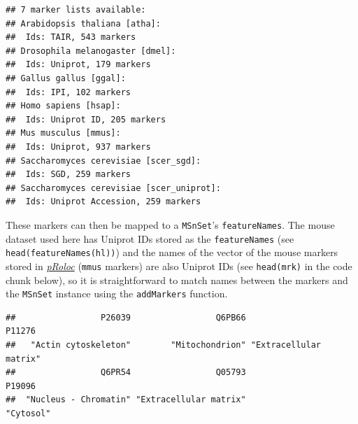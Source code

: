 \begin{Shaded}
\begin{Highlighting}[]
\NormalTok{()}
\end{Highlighting}
\end{Shaded}

\begin{verbatim}
## 7 marker lists available:
## Arabidopsis thaliana [atha]:
##  Ids: TAIR, 543 markers
## Drosophila melanogaster [dmel]:
##  Ids: Uniprot, 179 markers
## Gallus gallus [ggal]:
##  Ids: IPI, 102 markers
## Homo sapiens [hsap]:
##  Ids: Uniprot ID, 205 markers
## Mus musculus [mmus]:
##  Ids: Uniprot, 937 markers
## Saccharomyces cerevisiae [scer_sgd]:
##  Ids: SGD, 259 markers
## Saccharomyces cerevisiae [scer_uniprot]:
##  Ids: Uniprot Accession, 259 markers
\end{verbatim}

These markers can then be mapped to a \texttt{MSnSet}'s
\texttt{featureNames}. The mouse dataset used here has Uniprot IDs
stored as the \texttt{featureNames} (see
\texttt{head(featureNames(hl))}) and the names of the vector of the
mouse markers stored in
\emph{\href{http://bioconductor.org/packages/pRoloc}{pRoloc}}
(\texttt{mmus} markers) are also Uniprot IDs (see \texttt{head(mrk)} in
the code chunk below), so it is straightforward to match names between
the markers and the \texttt{MSnSet} instance using the
\texttt{addMarkers} function.

\begin{Shaded}
\begin{Highlighting}[]
\StringTok{ }\NormalTok{(} \NormalTok{)}
\end{Highlighting}
\end{Shaded}

\begin{verbatim}
##                 P26039                 Q6PB66                 P11276 
##   "Actin cytoskeleton"        "Mitochondrion" "Extracellular matrix" 
##                 Q6PR54                 Q05793                 P19096 
##  "Nucleus - Chromatin" "Extracellular matrix"              "Cytosol"
\end{verbatim}

\begin{Shaded}
\begin{Highlighting}[]
\StringTok{ }
\end{Highlighting}
\end{Shaded}

